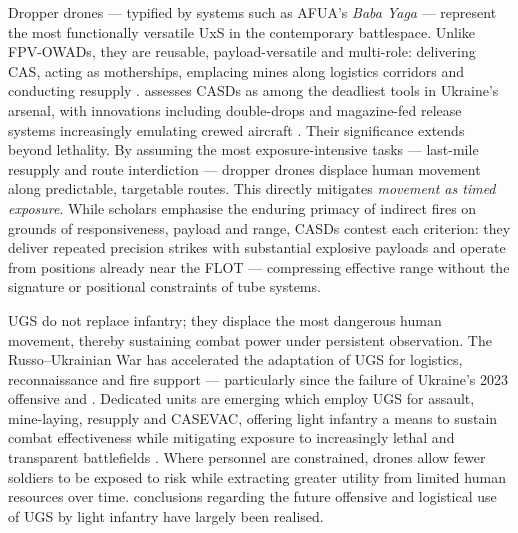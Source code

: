 {%
Dropper drones --- typified by systems such as AFUA's \textit{Baba Yaga} --- represent the most functionally versatile UxS in the contemporary battlespace. Unlike FPV-OWADs, they are reusable, payload-versatile and multi-role: delivering CAS, acting as motherships, emplacing mines along logistics corridors and conducting resupply \parencite[8]{watling_2025_10,azov_media_20251111_escape_impossible_drones_mines,garand_thumb_CUAS_2026_3_15}. \textcite[12]{watling_2025_10} assesses CASDs as among the deadliest tools in Ukraine's arsenal, with innovations including double-drops and magazine-fed release systems increasingly emulating crewed aircraft \parencite{murray_tuga,taylor_ukr}.
Their significance extends beyond lethality. By assuming the most exposure-intensive tasks --- last-mile resupply and route interdiction --- dropper drones displace human movement along predictable, targetable routes. This directly mitigates \textit{movement as timed exposure}. While scholars emphasise the enduring primacy of indirect fires on grounds of responsiveness, payload and range, CASDs contest each criterion: they deliver repeated precision strikes with substantial explosive payloads and operate from positions already near the FLOT --- compressing effective range without the signature or positional constraints of tube systems.

UGS do not replace infantry; they displace the most dangerous human movement, thereby sustaining combat power under persistent observation. The Russo--Ukrainian War has accelerated the adaptation of UGS for logistics, reconnaissance and fire support --- particularly since the failure of Ukraine's 2023 offensive \parencite{Kofman_Lee_2023_09_04} and \parencite[4--5]{watling_2025_10}. Dedicated units are emerging which employ UGS for assault, mine-laying, resupply and CASEVAC, offering light infantry a means to sustain combat effectiveness while mitigating exposure to increasingly lethal and transparent battlefields \parencite{bendett_2024_06_17,KIRICHENKO_2022A,third_army_corps_2025_10_23,watling_2025_10}. Where personnel are constrained, drones allow fewer soldiers to be exposed to risk while extracting greater utility from limited human resources over time.  conclusions regarding the future offensive and logistical use of UGS by light infantry have largely been realised.

}
